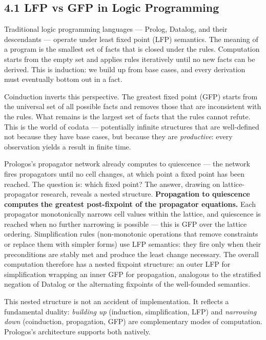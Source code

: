 \documentclass[11pt]{article}
\begin{document}
\subsection{4.1 LFP vs GFP in Logic Programming}
\label{sec:org1e438c3}

Traditional logic programming languages --- Prolog, Datalog, and their
descendants --- operate under least fixed point (LFP) semantics. The
meaning of a program is the smallest set of facts that is closed under
the rules. Computation starts from the empty set and applies rules
iteratively until no new facts can be derived. This is induction: we
build up from base cases, and every derivation must eventually bottom
out in a fact.

Coinduction inverts this perspective. The greatest fixed point (GFP)
starts from the universal set of all possible facts and removes those
that are inconsistent with the rules. What remains is the largest set
of facts that the rules cannot refute. This is the world of codata ---
potentially infinite structures that are well-defined not because they
have base cases, but because they are \emph{productive}: every observation
yields a result in finite time.

Prologos's propagator network already computes to quiescence --- the
network fires propagators until no cell changes, at which point a
fixed point has been reached. The question is: which fixed point? The
answer, drawing on lattice-propagator research, reveals a nested
structure. \textbf{Propagation to quiescence computes the greatest
post-fixpoint of the propagator equations.} Each propagator
monotonically narrows cell values within the lattice, and quiescence
is reached when no further narrowing is possible --- this is GFP over
the lattice ordering. Simplification rules (non-monotonic operations
that remove constraints or replace them with simpler forms) use LFP
semantics: they fire only when their preconditions are stably met and
produce the least change necessary. The overall computation therefore
has a nested fixpoint structure: an outer LFP for simplification
wrapping an inner GFP for propagation, analogous to the stratified
negation of Datalog or the alternating fixpoints of the
well-founded semantics.

This nested structure is not an accident of implementation. It
reflects a fundamental duality: \emph{building up} (induction,
simplification, LFP) and \emph{narrowing down} (coinduction, propagation,
GFP) are complementary modes of computation. Prologos's architecture
supports both natively.
\end{document}
